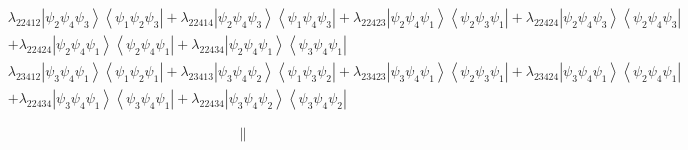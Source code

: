 \documentclass[aps,preprint]{revtex4}%
\begin{document}
\begin{align*}
& \lambda_{22412}\left\vert \psi_{2}\psi_{4}\psi_{3}\right\rangle \left\langle
\psi_{1}\psi_{2}\psi_{3}\right\vert +\lambda_{22414}\left\vert \psi_{2}%
\psi_{4}\psi_{3}\right\rangle \left\langle \psi_{1}\psi_{4}\psi_{3}\right\vert
+\lambda_{22423}\left\vert \psi_{2}\psi_{4}\psi_{1}\right\rangle \left\langle
\psi_{2}\psi_{3}\psi_{1}\right\vert +\lambda_{22424}\left\vert \psi_{2}%
\psi_{4}\psi_{3}\right\rangle \left\langle \psi_{2}\psi_{4}\psi_{3}\right\vert
\\
& +\lambda_{22424}\left\vert \psi_{2}\psi_{4}\psi_{1}\right\rangle
\left\langle \psi_{2}\psi_{4}\psi_{1}\right\vert +\lambda_{22434}\left\vert
\psi_{2}\psi_{4}\psi_{1}\right\rangle \left\langle \psi_{3}\psi_{4}\psi
_{1}\right\vert
\end{align*}%
\begin{align}
& \lambda_{23412}\left\vert \psi_{3}\psi_{4}\psi_{1}\right\rangle \left\langle
\psi_{1}\psi_{2}\psi_{1}\right\vert +\lambda_{23413}\left\vert \psi_{3}%
\psi_{4}\psi_{2}\right\rangle \left\langle \psi_{1}\psi_{3}\psi_{2}\right\vert
+\lambda_{23423}\left\vert \psi_{3}\psi_{4}\psi_{1}\right\rangle \left\langle
\psi_{2}\psi_{3}\psi_{1}\right\vert +\lambda_{23424}\left\vert \psi_{3}%
\psi_{4}\psi_{1}\right\rangle \left\langle \psi_{2}\psi_{4}\psi_{1}\right\vert
\nonumber\\
& +\lambda_{22434}\left\vert \psi_{3}\psi_{4}\psi_{1}\right\rangle
\left\langle \psi_{3}\psi_{4}\psi_{1}\right\vert +\lambda_{22434}\left\vert
\psi_{3}\psi_{4}\psi_{2}\right\rangle \left\langle \psi_{3}\psi_{4}\psi
_{2}\right\vert
\end{align}
%

\begin{equation}
\parallel
\end{equation}
%
\end{document}
